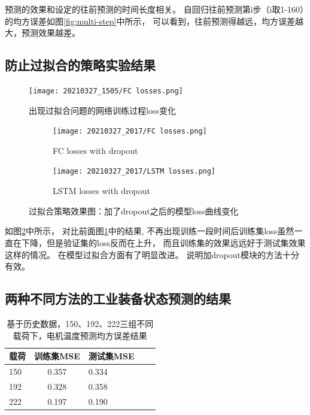   预测的效果和设定的往前预测的时间长度相关。
  自回归往前预测第i步（i取1-160）的均方误差如图\ref{fig:multi-step}中所示，
  可以看到，往前预测得越远，均方误差越大，预测效果越差。
\subsection{防止过拟合的策略实验结果}

  \begin{figure}
    \centering
    \texttt{[image: 20210327\_1505/FC losses.png]}
    \caption{出现过拟合问题的网络训练过程loss变化}
    \label{fig:overfit FC 1}
  \end{figure}

  \begin{figure}
    \centering
    \begin{subfigure}[b]{0.45\textwidth}
      \centering
      \texttt{[image: 20210327\_2017/FC losses.png]}
      \caption{FC losses with dropout}
      \label{fig:FC losses with dropout}
    \end{subfigure}
    \hfill
    \begin{subfigure}[b]{0.45\textwidth}
        \centering
        \texttt{[image: 20210327\_2017/LSTM losses.png]}
        \caption{LSTM losses with dropout}
        \label{fig:LSTM losses with dropout}
    \end{subfigure}
       \caption{过拟合策略效果图：加了dropout之后的模型loss曲线变化}
       \label{fig:losses with dropout}
  \end{figure}

  如图\ref{fig:FC losses with dropout}中所示，
  对比前面图\ref{fig:overfit FC 1}中的结果,
  不再出现训练一段时间后训练集loss虽然一直在下降，但是验证集的loss反而在上升，
  而且训练集的效果远远好于测试集效果这样的情况。
  在模型过拟合方面有了明显改进。
  说明加dropout模块的方法十分有效。

\subsection{两种不同方法的工业装备状态预测的结果}
  
  \begin{table}
    \centering
    \caption{基于历史数据，150、192、222三组不同载荷下，电机温度预测均方误差结果}
    \begin{tabular}{lclcl}
      \toprule
      载荷       & 训练集MSE & 测试集MSE                                   \\
      \midrule
      150    & 0.357 & 0.334                                \\
      192 & 0.328 & 0.358                                     \\
      222 & 0.197 & 0.190                  \\
      \bottomrule
    \end{tabular}
    \label{tab:regression motor results}
  \end{table}

